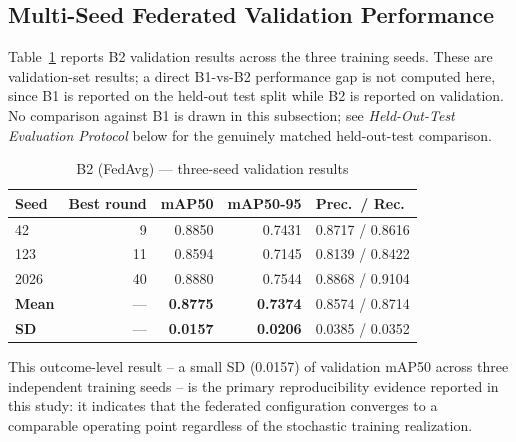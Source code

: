 \documentclass[11pt]{article}
\begin{document}
\subsection{Multi-Seed Federated Validation Performance}
Table~\ref{tab:b2} reports B2 validation results across the three training seeds. These are validation-set results; a direct B1-vs-B2 performance gap is not computed here, since B1 is reported on the held-out test split while B2 is reported on validation. No comparison against B1 is drawn in this subsection; see \emph{Held-Out-Test Evaluation Protocol} below for the genuinely matched held-out-test comparison.

\begin{table}[H]
  \centering
  \caption{B2 (FedAvg) --- three-seed validation results}
  \label{tab:b2}
  \begin{tabular}{lrrrl}
    \toprule
    Seed & Best round & mAP50 & mAP50-95 & Prec.\ / Rec. \\
    \midrule
    42   & 9  & 0.8850 & 0.7431 & 0.8717 / 0.8616 \\
    123  & 11 & 0.8594 & 0.7145 & 0.8139 / 0.8422 \\
    2026 & 40 & 0.8880 & 0.7544 & 0.8868 / 0.9104 \\
    \midrule
    \textbf{Mean} & --- & \textbf{0.8775} & \textbf{0.7374} & 0.8574 / 0.8714 \\
    \textbf{SD}   & --- & \textbf{0.0157} & \textbf{0.0206} & 0.0385 / 0.0352 \\
    \bottomrule
  \end{tabular}
\end{table}

This outcome-level result -- a small SD (0.0157) of validation mAP50 across three independent training seeds -- is the primary reproducibility evidence reported in this study: it indicates that the federated configuration converges to a comparable operating point regardless of the stochastic training realization.
\end{document}
